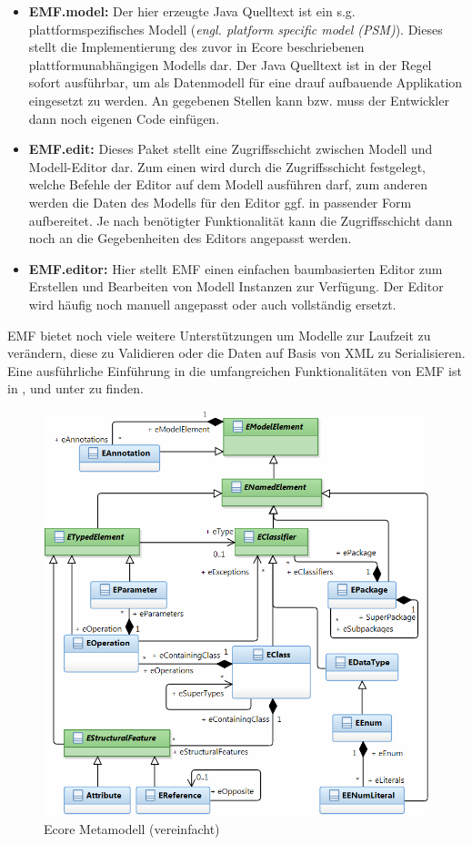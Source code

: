 \begin{itemize}
  \item \textbf{EMF.model:} Der hier erzeugte Java Quelltext ist ein s.g. plattformspezifisches
  Modell (\textit{engl. platform specific model (PSM)}). Dieses stellt die Implementierung des zuvor
  in Ecore beschriebenen plattformunabhängigen Modells dar. Der Java Quelltext ist in der Regel
  sofort ausführbar, um als Datenmodell für eine drauf aufbauende Applikation eingesetzt zu werden.
  An gegebenen Stellen kann bzw. muss der Entwickler dann noch eigenen Code einfügen.
  
  \item \textbf{EMF.edit:} Dieses Paket stellt eine Zugriffsschicht zwischen Modell und
  Modell-Editor dar. Zum einen wird durch die Zugriffsschicht festgelegt, welche Befehle der Editor
  auf dem Modell ausführen darf, zum anderen werden die Daten des Modells für den Editor ggf. in
  passender Form aufbereitet. Je nach benötigter Funktionalität kann die Zugriffsschicht dann noch
  an die Gegebenheiten des Editors angepasst werden.
  
  \item \textbf{EMF.editor:} Hier stellt EMF einen einfachen baumbasierten Editor zum Erstellen und
  Bearbeiten von Modell Instanzen zur Verfügung. Der Editor wird häufig noch manuell angepasst oder
  auch vollständig ersetzt.
\end{itemize}
EMF bietet noch viele weitere Unterstützungen um Modelle zur Laufzeit zu verändern, diese zu
Validieren oder die Daten auf Basis von XML zu Serialisieren. Eine ausführliche Einführung in die
umfangreichen Funktionalitäten von EMF ist in \cite{SBPM2009}, \cite{EMFCon} und unter \cite{EMF} zu
finden.

\begin{figure}[h!]
  \centering
  \includegraphics[scale=0.7]{images/ecore_metamodel.png}
  \caption{Ecore Metamodell (vereinfacht)}
  \label{fig:ecore_metamodel}
\end{figure}

